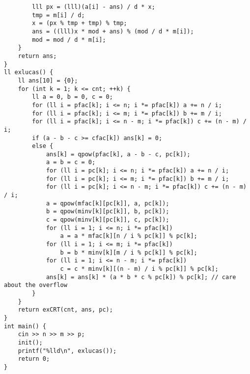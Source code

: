 \begin{verbatim}
        lll px = (lll)(a[i] - ans) / d * x;
        tmp = m[i] / d;
        x = (px % tmp + tmp) % tmp;
        ans = ((lll)x * mod + ans) % (mod / d * m[i]);
        mod = mod / d * m[i];
    }
    return ans;
}
ll exlucas() {
    ll ans[10] = {0};
    for (int k = 1; k <= cnt; ++k) {
        ll a = 0, b = 0, c = 0;
        for (ll i = pfac[k]; i <= n; i *= pfac[k]) a += n / i;
        for (ll i = pfac[k]; i <= m; i *= pfac[k]) b += m / i;
        for (ll i = pfac[k]; i <= n - m; i *= pfac[k]) c += (n - m) / i;
        if (a - b - c >= cfac[k]) ans[k] = 0;
        else {
            ans[k] = qpow(pfac[k], a - b - c, pc[k]);
            a = b = c = 0;
            for (ll i = pc[k]; i <= n; i *= pfac[k]) a += n / i;
            for (ll i = pc[k]; i <= m; i *= pfac[k]) b += m / i;
            for (ll i = pc[k]; i <= n - m; i *= pfac[k]) c += (n - m) / i;
            a = qpow(mfac[k][pc[k]], a, pc[k]);
            b = qpow(minv[k][pc[k]], b, pc[k]);
            c = qpow(minv[k][pc[k]], c, pc[k]);
            for (ll i = 1; i <= n; i *= pfac[k])
                a = a * mfac[k][n / i % pc[k]] % pc[k];
            for (ll i = 1; i <= m; i *= pfac[k])
                b = b * minv[k][m / i % pc[k]] % pc[k];
            for (ll i = 1; i <= n - m; i *= pfac[k])
                c = c * minv[k][(n - m) / i % pc[k]] % pc[k];
            ans[k] = ans[k] * (a * b * c % pc[k]) % pc[k]; // care about the overflow
        }
    }
    return exCRT(cnt, ans, pc);
}
int main() {
    cin >> n >> m >> p;
    init();
    printf("%lld\n", exlucas());
    return 0;
}
\end{verbatim}



